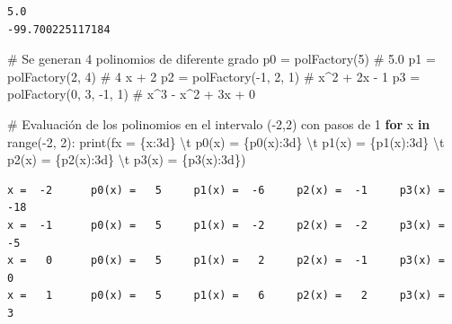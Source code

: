 \documentclass[
  spanish,
  letterpaper,
]{scrbook}
\newenvironment{Shaded}{\begin{snugshade}}{\end{snugshade}}
\newcommand{\BuiltInTok}[1]{\textcolor[rgb]{0.00,0.23,0.31}{#1}}
\newcommand{\CharTok}[1]{\textcolor[rgb]{0.13,0.47,0.30}{#1}}
\newcommand{\CommentTok}[1]{\textcolor[rgb]{0.37,0.37,0.37}{#1}}
\newcommand{\ControlFlowTok}[1]{\textcolor[rgb]{0.00,0.23,0.31}{\textbf{#1}}}
\newcommand{\DecValTok}[1]{\textcolor[rgb]{0.68,0.00,0.00}{#1}}
\newcommand{\KeywordTok}[1]{\textcolor[rgb]{0.00,0.23,0.31}{\textbf{#1}}}
\newcommand{\NormalTok}[1]{\textcolor[rgb]{0.00,0.23,0.31}{#1}}
\newcommand{\OperatorTok}[1]{\textcolor[rgb]{0.37,0.37,0.37}{#1}}
\newcommand{\SpecialCharTok}[1]{\textcolor[rgb]{0.37,0.37,0.37}{#1}}
\newcommand{\SpecialStringTok}[1]{\textcolor[rgb]{0.13,0.47,0.30}{#1}}
\theoremstyle{definition}
\theoremstyle{remark}
\begin{document}
\begin{verbatim}
5.0
-99.700225117184
\end{verbatim}

\begin{Shaded}
\begin{Highlighting}[]
\CommentTok{\# Se generan 4 polinomios de diferente grado}
\NormalTok{p0 }\OperatorTok{=}\NormalTok{ polFactory(}\DecValTok{5}\NormalTok{)           }\CommentTok{\# 5.0}
\NormalTok{p1 }\OperatorTok{=}\NormalTok{ polFactory(}\DecValTok{2}\NormalTok{, }\DecValTok{4}\NormalTok{)        }\CommentTok{\# 4 x + 2}
\NormalTok{p2 }\OperatorTok{=}\NormalTok{ polFactory(}\OperatorTok{{-}}\DecValTok{1}\NormalTok{, }\DecValTok{2}\NormalTok{, }\DecValTok{1}\NormalTok{)    }\CommentTok{\# x\^{}2 + 2x {-} 1}
\NormalTok{p3 }\OperatorTok{=}\NormalTok{ polFactory(}\DecValTok{0}\NormalTok{, }\DecValTok{3}\NormalTok{, }\OperatorTok{{-}}\DecValTok{1}\NormalTok{, }\DecValTok{1}\NormalTok{) }\CommentTok{\# x\^{}3 {-} x\^{}2 + 3x + 0}

\CommentTok{\# Evaluación de los polinomios en el intervalo ({-}2,2) con pasos de 1}
\ControlFlowTok{for}\NormalTok{ x }\KeywordTok{in} \BuiltInTok{range}\NormalTok{(}\OperatorTok{{-}}\DecValTok{2}\NormalTok{, }\DecValTok{2}\NormalTok{):}
    \BuiltInTok{print}\NormalTok{(}\SpecialStringTok{f\textquotesingle{}x = }\SpecialCharTok{\{}\NormalTok{x}\SpecialCharTok{:3d\}}\SpecialStringTok{ }\CharTok{\textbackslash{}t}\SpecialStringTok{ p0(x) = }\SpecialCharTok{\{}\NormalTok{p0(x)}\SpecialCharTok{:3d\}}\SpecialStringTok{ }\CharTok{\textbackslash{}t}\SpecialStringTok{ p1(x) = }\SpecialCharTok{\{}\NormalTok{p1(x)}\SpecialCharTok{:3d\}}\SpecialStringTok{ }\CharTok{\textbackslash{}t}\SpecialStringTok{ p2(x) = }\SpecialCharTok{\{}\NormalTok{p2(x)}\SpecialCharTok{:3d\}}\SpecialStringTok{ }\CharTok{\textbackslash{}t}\SpecialStringTok{ p3(x) = }\SpecialCharTok{\{}\NormalTok{p3(x)}\SpecialCharTok{:3d\}}\SpecialStringTok{\textquotesingle{}}\NormalTok{)}
\end{Highlighting}
\end{Shaded}

\begin{verbatim}
x =  -2      p0(x) =   5     p1(x) =  -6     p2(x) =  -1     p3(x) = -18
x =  -1      p0(x) =   5     p1(x) =  -2     p2(x) =  -2     p3(x) =  -5
x =   0      p0(x) =   5     p1(x) =   2     p2(x) =  -1     p3(x) =   0
x =   1      p0(x) =   5     p1(x) =   6     p2(x) =   2     p3(x) =   3
\end{verbatim}
\end{document}
